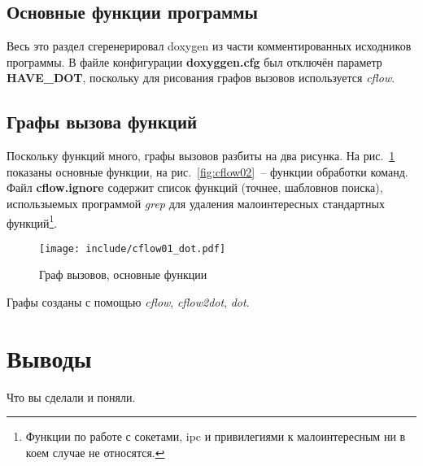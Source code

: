 \documentclass[a4paper,12pt]{report}
\begin{document}
\section{Основные функции программы}

Весь это раздел сгеренерировал doxygen из части комментированных исходников программы. В файле конфигурации \textbf{doxyggen.cfg} был отключён параметр \textbf{HAVE\_DOT}, поскольку для рисования графов вызовов используется \textit{cflow}.

%
%
%
%
%
%
%
%

\section{Графы вызова функций}

Поскольку функций много, графы вызовов разбиты на два рисунка. На рис.~\ref{fig:cflow01} показаны основные функции, на рис.~\ref{fig:cflow02}~-- функции обработки команд. Файл \textbf{cflow.ignore} содержит список функций (точнее, шабловнов поиска), использыемых программой \textit{grep} для удаления малоинтересных стандартных функций\footnote{Функции по работе с сокетами, ipc и привилегиями к малоинтересным ни в коем случае не относятся.}.

\begin{figure}
\centering
\texttt{[image: include/cflow01\_dot.pdf]}
\caption{Граф вызовов, основные функции}
\label{fig:cflow01}
\end{figure}

Графы созданы с помощью \textit{cflow}, \textit{cflow2dot}, \textit{dot}.

\chapter*{Выводы}

Что вы сделали и поняли.
\end{document}
